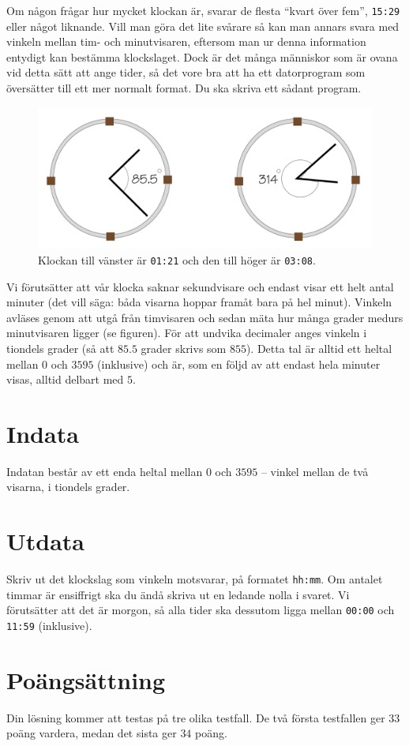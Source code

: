 Om någon frågar hur mycket klockan är, svarar de flesta ``kvart över fem'', \texttt{15:29} eller något liknande.
Vill man göra det lite svårare så kan man annars svara med vinkeln mellan tim- och minutvisaren, eftersom man ur denna information entydigt kan bestämma klockslaget.
Dock är det många människor som är ovana vid detta sätt att ange tider, så det vore bra att ha ett datorprogram som översätter till ett mer normalt format.
Du ska skriva ett sådant program.

\begin{figure}[h]
\includegraphics[width=\textwidth]{fig.png}
    \caption{Klockan till vänster är \texttt{01:21} och den till höger är \texttt{03:08}.}
\end{figure}

Vi förutsätter att vår klocka saknar sekundvisare och endast visar ett helt antal minuter (det vill säga: båda visarna hoppar framåt bara på hel minut).
Vinkeln avläses genom att utgå från timvisaren och sedan mäta hur många grader medurs minutvisaren ligger (se figuren).
För att undvika decimaler anges vinkeln i tiondels grader (så att $85.5$ grader skrivs som $855$).
Detta tal är alltid ett heltal mellan $0$ och $3595$ (inklusive) och är, som en följd av att endast hela minuter visas, alltid delbart med $5$.

\section*{Indata}
Indatan består av ett enda heltal mellan $0$ och $3595$ -- vinkel mellan de två visarna, i tiondels grader.

\section*{Utdata}
Skriv ut det klockslag som vinkeln motsvarar, på formatet \texttt{hh:mm}.
Om antalet timmar är ensiffrigt ska du ändå skriva ut en ledande nolla i svaret.
Vi förutsätter att det är morgon, så alla tider ska dessutom ligga mellan \texttt{00:00} och \texttt{11:59} (inklusive).

\section*{Poängsättning}
Din lösning kommer att testas på tre olika testfall.
De två första testfallen ger $33$ poäng vardera, medan det sista ger $34$ poäng.
